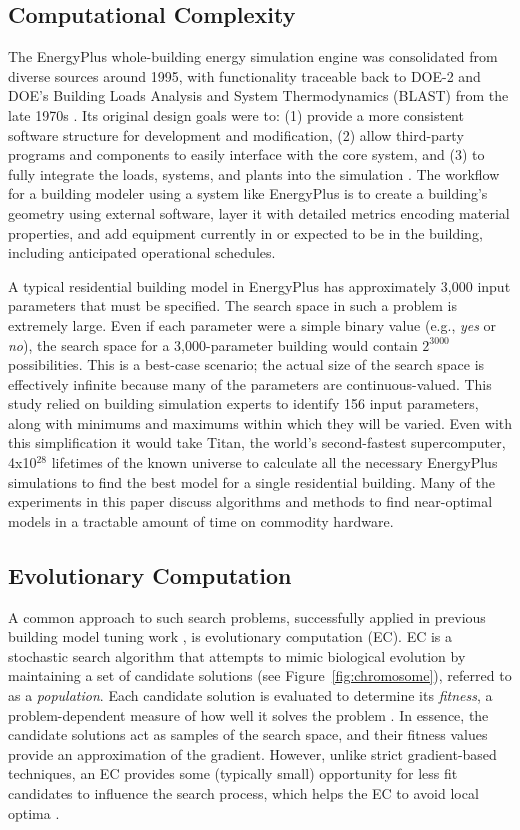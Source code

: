 \documentclass[preprint, review, 12pt]{elsarticle}
\begin{document}
\subsection{Computational Complexity}
The EnergyPlus whole-building energy simulation engine was consolidated from diverse sources around 1995, with functionality traceable back to DOE-2 and DOE's Building Loads Analysis and System Thermodynamics (BLAST) from the late 1970s \cite{cit:energyplus}. Its original design goals were to: (1) provide a more consistent software structure for development and modification, (2) allow third-party programs and components to easily interface with the core system, and (3) to fully integrate the loads, systems, and plants into the simulation \cite{cit:energyplus}. The workflow for a building modeler using a system like EnergyPlus is to create a building's geometry using external software, layer it with detailed metrics encoding material properties, and add equipment currently in or expected to be in the building, including anticipated operational schedules.

A typical residential building model in EnergyPlus has approximately 3,000 input parameters that must be specified. The search space in such a problem is extremely large. Even if each parameter were a simple binary value (e.g., \emph{yes} or \emph{no}), the search space for a 3,000-parameter building would contain $2^{3000}$ possibilities. This is a best-case scenario; the actual size of the search space is effectively infinite because many of the parameters are continuous-valued. This study relied on building simulation experts to identify 156 input parameters, along with minimums and maximums within which they will be varied. Even with this simplification it would take Titan, the world's second-fastest supercomputer, 4x10$^28$ lifetimes of the known universe to calculate all the necessary EnergyPlus simulations to find the best model for a single residential building. Many of the experiments in this paper discuss algorithms and methods to find near-optimal models in a tractable amount of time on commodity hardware.

\subsection{Evolutionary Computation}
A common approach to such search problems, successfully applied in previous building model tuning work \cite{cit:garrett2013}, is evolutionary computation (EC). EC \cite{cit:dejong1993,cit:spears1993,cit:fogel1994,cit:fogel2000} is a stochastic search algorithm that attempts to mimic biological evolution by maintaining a set of candidate solutions (see Figure~\ref{fig:chromosome}), referred to as a \emph{population}. Each candidate solution is evaluated to determine its \emph{fitness}, a problem-dependent measure of how well it solves the problem \cite{cit:dejong2006}. In essence, the candidate solutions act as samples of the search space, and their fitness values provide an approximation of the gradient. However, unlike strict gradient-based techniques, an EC provides some (typically small) opportunity for less fit candidates to influence the search process, which helps the EC to avoid local optima \cite{cit:michalewicz2004}. 
\end{document}
